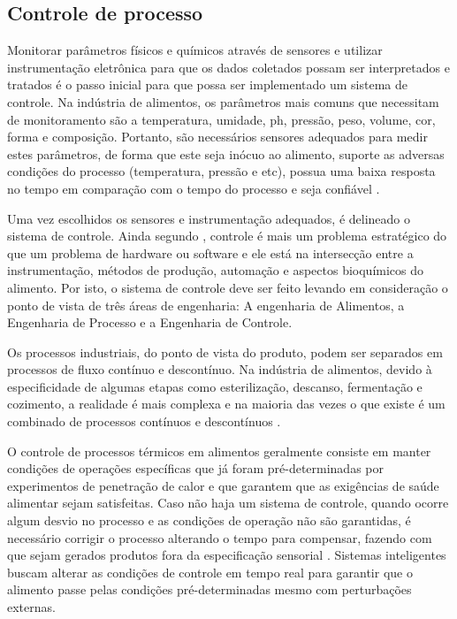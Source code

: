 \subsection{Controle de processo}

Monitorar parâmetros físicos e químicos através de sensores e utilizar instrumentação eletrônica para que os dados coletados possam ser interpretados e tratados é o passo inicial para que possa ser implementado um sistema de controle. Na indústria de alimentos, os parâmetros mais comuns que necessitam de monitoramento são a temperatura, umidade, ph, pressão, peso, volume, cor, forma e composição. Portanto, são necessários sensores adequados para medir estes parâmetros, de forma que este seja inócuo ao alimento, suporte as adversas condições do processo (temperatura, pressão e etc), possua uma baixa resposta no tempo em comparação com o tempo do processo e seja confiável \citep{process-monitoring-online}.

Uma vez escolhidos os sensores e instrumentação adequados, é delineado o sistema de controle. Ainda segundo \citet{process-monitoring-online}, controle é mais um problema estratégico do que um problema de hardware ou software e ele está na intersecção entre a instrumentação, métodos de produção, automação e aspectos bioquímicos do alimento. Por isto, o sistema de controle deve ser feito levando em consideração o ponto de vista de três áreas de engenharia: A engenharia de Alimentos, a Engenharia de Processo e a Engenharia de Controle.

Os processos industriais, do ponto de vista do produto, podem ser separados em processos de fluxo contínuo e descontínuo. Na indústria de alimentos, devido à especificidade de algumas etapas como esterilização, descanso, fermentação e cozimento, a realidade é mais complexa e na maioria das vezes o que existe é um combinado de processos contínuos e descontínuos \citep{food-processing-control}.  

O controle de processos térmicos em alimentos geralmente consiste em manter condições de operações específicas que já foram pré-determinadas por experimentos de penetração de calor e que garantem que as exigências de saúde alimentar sejam satisfeitas. Caso não haja um sistema de controle, quando ocorre algum desvio no processo e as condições de operação não são garantidas, é necessário corrigir o processo alterando o tempo para compensar, fazendo com que sejam gerados produtos fora da especificação sensorial \citep{advances-intelligent}. Sistemas inteligentes buscam alterar as condições de controle em tempo real para garantir que o alimento passe pelas condições pré-determinadas mesmo com perturbações externas.

